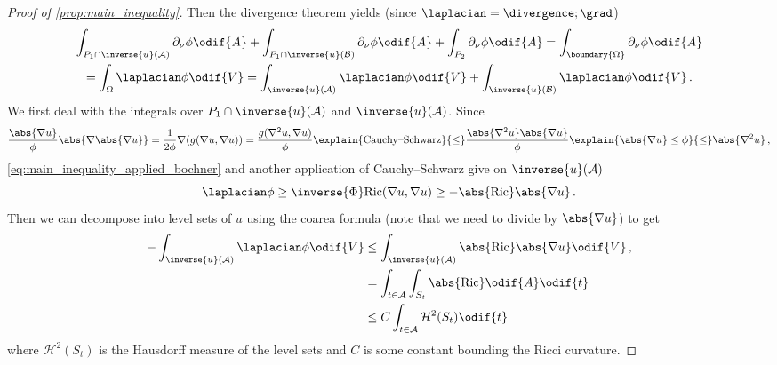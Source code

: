 \documentclass[titlepage,numbers=noenddot,oneside,%
cleardoublepage=empty,paper=a4,fontsize=11pt,%
english,%
]{scrartcl}
\newcommand*{\mathcomma}{\,,}
\newcommand*{\mathfullstop}{\,.}
\newcommand{\Ricci}{\mathrm{Ric}} %
\begin{document}
{\begin{proof}[Proof of \cref{prop:main_inequality}]
    Then the divergence theorem yields (since \( \laplacian =\divergence;\grad \))
    \begin{multline}
        \int_{P_1\cap \inverse{u}(\mathcal{A})}\partial_\nu \phi\odif{A}+\int_{P_1\cap \inverse{u}(\mathcal{B})}\partial_\nu \phi\odif{A}+\int_{P_2}\partial_\nu \phi\odif{A}=\int_{\boundary{\Omega}}\partial_\nu \phi\odif{A}\\
        =\int_{\Omega}\laplacian \phi\odif{V}=\int_{\inverse{u}(\mathcal{A})}\laplacian \phi\odif{V}+\int_{\inverse{u}(\mathcal{B})}\laplacian \phi\odif{V}\mathfullstop\label{eq:main_inequality_branching_point}
    \end{multline}
    We first deal with the integrals over \( P_1\cap \inverse{u}(\mathcal{A}) \) and \( \inverse{u}(\mathcal{A}) \). Since
    \begin{equation*}
        \frac{\abs{\nabla u}}{\phi}\abs{\nabla \abs{\nabla u}}=\frac{1}{2\phi}\nabla(g(\nabla u,\nabla u))=\frac{g(\nabla^2 u,\nabla u)}{\phi}\explain{\text{Cauchy--Schwarz}}{\leq}\frac{\abs{\nabla^2 u}\abs{\nabla u}}{\phi}\explain{\abs{\nabla u}\leq \phi}{\leq} \abs{\nabla^2 u}\mathcomma
    \end{equation*}
    \cref{eq:main_inequality_applied_bochner} and another application of Cauchy--Schwarz give on \( \inverse{u}(\mathcal{A}) \)
    \begin{equation*}
        \laplacian\phi\geq \inverse{\Phi}\Ricci(\nabla u, \nabla u)\geq -\abs{\Ricci}\abs{\nabla u}\mathfullstop
    \end{equation*}
    Then we can decompose into level sets of \( u \) using the coarea formula (note that we need to divide by \( \abs{\nabla u} \)) to get
    \begin{equation*}
        \begin{aligned}[t]
            -\int_{\inverse{u}(\mathcal{A})}\laplacian\phi\odif{V}&\leq \int_{\inverse{u}(\mathcal{A})}\abs{\Ricci}\abs{\nabla u}\odif{V}\\ 
            &=\int_{t\in \mathcal{A}}\int_{S_t}\abs{\Ricci}\odif{A}\odif{t}\\
            &\leq C\int_{t\in \mathcal{A}}\mathcal{H}^2(S_t)\odif{t}
        \end{aligned}\mathcomma
    \end{equation*}
    where \( \mathcal{H}^2(S_t) \) is the Hausdorff measure of the level sets and \( C \) is some constant bounding the Ricci curvature.


\end{proof}}
\end{document}
